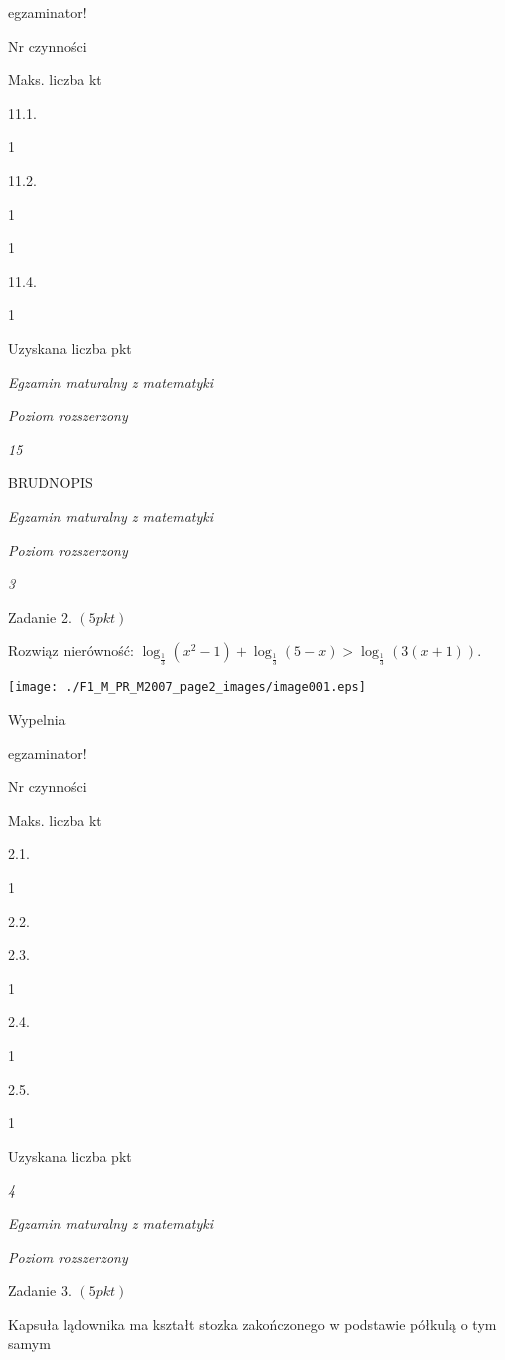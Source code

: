 \documentclass[a4paper,12pt]{article}
\begin{document}
egzaminator!

Nr czynności

Maks. liczba kt

11.1.

1

11.2.

1

1

11.4.

1

Uzyskana liczba pkt





{\it Egzamin maturalny z matematyki}

{\it Poziom rozszerzony}

{\it 15}

BRUDNOPIS





{\it Egzamin maturalny z matematyki}

{\it Poziom rozszerzony}

{\it 3}

Zadanie 2. $(5pkt)$

Rozwiąz nierówność: $\log_{\frac{1}{3}}(x^{2}-1)+\log_{\frac{1}{3}}(5-x)>\log_{\frac{1}{3}}(3(x+1)).$
\begin{center}
\texttt{[image: ./F1\_M\_PR\_M2007\_page2\_images/image001.eps]}
\end{center}
Wypelnia

egzaminator!

Nr czynności

Maks. liczba kt

2.1.

1

2.2.

2.3.

1

2.4.

1

2.5.

1

Uzyskana liczba pkt





{\it 4}

{\it Egzamin maturalny z matematyki}

{\it Poziom rozszerzony}

Zadanie 3. $(5pkt)$

Kapsuła lądownika ma kształt stozka zakończonego w podstawie półkulą o tym samym
\end{document}
